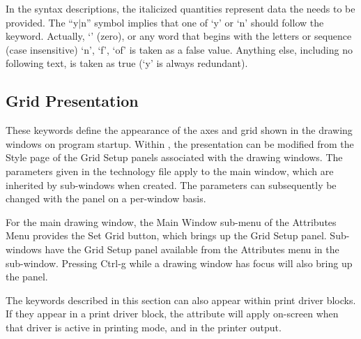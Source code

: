 In the syntax descriptions, the italicized quantities represent data
the needs to be provided.  The ``{\vt y}$|${\vt n}'' symbol implies that one
of `{\vt y}' or `{\vt n}' should follow the keyword.  Actually, `{}' (zero), or any word that begins with the letters or sequence
(case insensitive) `{\vt n}', `{\vt f}', `{\vt of}' is taken as a
false value.  Anything else, including no following text, is taken as
true (`{\vt y}' is always redundant).


\subsection{Grid Presentation}

These keywords define the appearance of the axes and grid shown in the
drawing windows on program startup.  Within {\Xic}, the presentation
can be modified from the {\cb Style} page of the {\cb Grid Setup}
panels associated with the drawing windows.  The parameters given in
the technology file apply to the main window, which are inherited by
sub-windows when created.  The parameters can subsequently be changed
with the panel on a per-window basis.

For the main drawing window, the {\cb Main Window} sub-menu of the
{\cb Attributes Menu} provides the {\cb Set Grid} button, which brings
up the {\cb Grid Setup} panel.  Sub-windows have the {\cb Grid Setup}
panel available from the {\cb Attributes} menu in the sub-window. 
Pressing {\kb Ctrl-g} while a drawing window has focus will also bring
up the panel.

The keywords described in this section can also appear within print
driver blocks.  If they appear in a print driver block, the attribute
will apply on-screen when that driver is active in printing mode, and
in the printer output.

